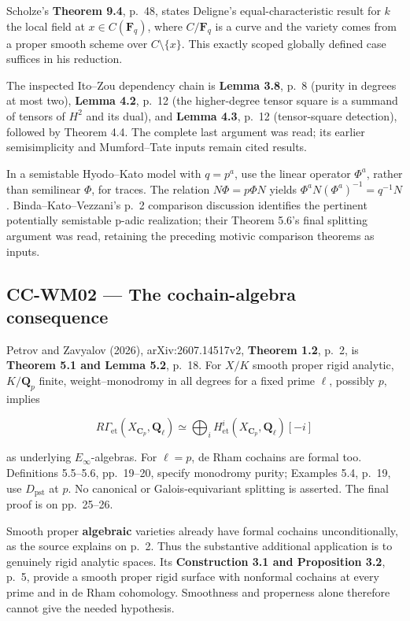\documentclass[11pt,a4paper]{article}
\theoremstyle{definition}\newtheorem{definition}[theorem]{Definition}
\theoremstyle{remark}\newtheorem{remark}[theorem]{Remark}
\begin{document}
Scholze's \textbf{Theorem 9.4}, p.~48, states Deligne's
equal-characteristic result for \(k\) the local field at
\(x\in C(\mathbf F_q)\), where \(C/\mathbf F_q\) is a curve and the
variety comes from a proper smooth scheme over \(C\setminus\{x\}\). This
exactly scoped globally defined case suffices in his reduction.

The inspected Ito--Zou dependency chain is \textbf{Lemma 3.8}, p.~8
(purity in degrees at most two), \textbf{Lemma 4.2}, p.~12 (the
higher-degree tensor square is a summand of tensors of \(H^2\) and its
dual), and \textbf{Lemma 4.3}, p.~12 (tensor-square detection), followed
by Theorem 4.4. The complete last argument was read; its earlier
semisimplicity and Mumford--Tate inputs remain cited results.

In a semistable Hyodo--Kato model with \(q=p^a\), use the linear
operator \(\Phi^a\), rather than semilinear \(\Phi\), for traces. The
relation \(N\Phi=p\Phi N\) yields \(\Phi^aN(\Phi^a)^{-1}=q^{-1}N\).
Binda--Kato--Vezzani's p.~2 comparison discussion identifies the
pertinent potentially semistable p-adic realization; their Theorem 5.6's
final splitting argument was read, retaining the preceding motivic
comparison theorems as inputs.

\subsection{CC-WM02 --- The cochain-algebra
consequence}\label{cc-wm02-the-cochain-algebra-consequence}

Petrov and Zavyalov (2026), arXiv:2607.14517v2, \textbf{Theorem 1.2},
p.~2, is \textbf{Theorem 5.1 and Lemma 5.2}, p.~18. For \(X/K\) smooth
proper rigid analytic, \(K/\mathbf Q_p\) finite, weight--monodromy in
all degrees for a fixed prime \(\ell\), possibly \(p\), implies

\[
 R\Gamma_{\mathrm{et}}(X_{\mathbf C_p},\mathbf Q_\ell)
 \simeq \bigoplus_i H^i_{\mathrm{et}}(X_{\mathbf C_p},\mathbf Q_\ell)[-i]
\]

as underlying \(E_\infty\)-algebras. For \(\ell=p\), de Rham cochains
are formal too. Definitions 5.5--5.6, pp.~19--20, specify monodromy
purity; Examples 5.4, p.~19, use \(D_{\mathrm{pst}}\) at \(p\). No
canonical or Galois-equivariant splitting is asserted. The final proof
is on pp.~25--26.

Smooth proper \textbf{algebraic} varieties already have formal cochains
unconditionally, as the source explains on p.~2. Thus the substantive
additional application is to genuinely rigid analytic spaces. Its
\textbf{Construction 3.1 and Proposition 3.2}, p.~5, provide a smooth
proper rigid surface with nonformal cochains at every prime and in de
Rham cohomology. Smoothness and properness alone therefore cannot give
the needed hypothesis.
\end{document}

